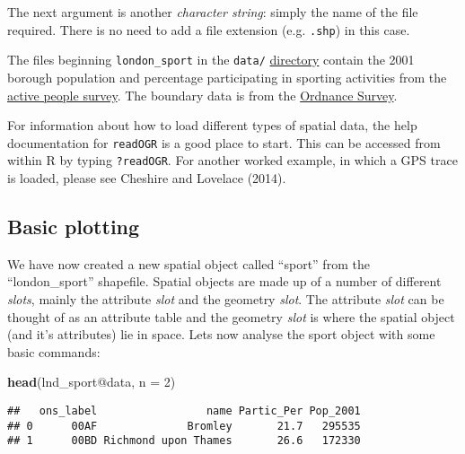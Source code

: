 \documentclass[]{article}
\newenvironment{Shaded}{}{}
\newcommand{\KeywordTok}[1]{\textcolor[rgb]{0.00,0.44,0.13}{\textbf{{#1}}}}
\newcommand{\DataTypeTok}[1]{\textcolor[rgb]{0.56,0.13,0.00}{{#1}}}
\newcommand{\DecValTok}[1]{\textcolor[rgb]{0.25,0.63,0.44}{{#1}}}
\newcommand{\NormalTok}[1]{{#1}}
\begin{document}
The next argument is another \emph{character string}: simply the name of
the file required. There is no need to add a file extension (e.g.
\texttt{.shp}) in this case.

The files beginning \texttt{london\_sport} in the \texttt{data/}
\href{https://github.com/Robinlovelace/Creating-maps-in-R/tree/master/data}{directory}
contain the 2001 borough population and percentage participating in
sporting activities from the
\href{http://data.london.gov.uk/datastore/package/active-people-survey-kpi-data-borough}{active
people survey}. The boundary data is from the
\href{http://www.ordnancesurvey.co.uk/oswebsite/opendata/}{Ordnance
Survey}.

For information about how to load different types of spatial data, the
help documentation for \texttt{readOGR} is a good place to start. This
can be accessed from within R by typing \texttt{?readOGR}. For another
worked example, in which a GPS trace is loaded, please see Cheshire and
Lovelace (2014).

\subsection{Basic plotting}\label{basic-plotting}

We have now created a new spatial object called ``sport'' from the
``london\_sport'' shapefile. Spatial objects are made up of a number of
different \emph{slots}, mainly the attribute \emph{slot} and the
geometry \emph{slot}. The attribute \emph{slot} can be thought of as an
attribute table and the geometry \emph{slot} is where the spatial object
(and it's attributes) lie in space. Lets now analyse the sport object
with some basic commands:

\begin{Shaded}
\begin{Highlighting}[]
\KeywordTok{head}\NormalTok{(lnd_sport@data, }\DataTypeTok{n =} \DecValTok{2}\NormalTok{)}
\end{Highlighting}
\end{Shaded}

\begin{verbatim}
##   ons_label                 name Partic_Per Pop_2001
## 0      00AF              Bromley       21.7   295535
## 1      00BD Richmond upon Thames       26.6   172330
\end{verbatim}

\begin{Shaded}
\end{Shaded}
\end{document}
